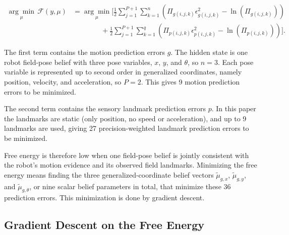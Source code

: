 \begin{align}
    \underset{\mu}{\arg\min}\, \mathcal{F}(y,\mu)
    &=
    \underset{\mu}{\arg\min}
    \Bigg[
    \frac{1}{2}
    \sum_{j=1}^{P+1}
    \sum_{k=1}^{n}
    \left(
        \Pi_{g(i,j,k)}
        \epsilon^2_{g(i,j,k)}
        -
        \ln\left(\Pi_{g(i,j,k)}\right)
    \right)
    \nonumber \\
    &\qquad\qquad+
    \frac{1}{2}
    \sum_{j=1}^{P+1}
    \sum_{k=1}^{q}
    \left(
        \Pi_{p(i,j,k)}
        \epsilon^2_{p(i,j,k)}
        -
        \ln\left(\Pi_{p(i,j,k)}\right)
    \right)
    \Bigg].
    \label{eq:vfe-motion-place-expanded}
\end{align}

The first term contains the motion prediction errors $g$. The hidden state is one robot field-pose belief with three pose variables, $x$, $y$, and $\theta$, so $n=3$. Each pose variable is represented up to second order in generalized coordinates, namely position, velocity, and acceleration, so $P=2$. This gives 9 motion prediction errors to be minimized.

The second term contains the sensory landmark prediction errors $p$. In this paper the landmarks are static (only position, no speed or acceleration), and up to 9 landmarks are used, giving 27 precision-weighted landmark prediction errors to be minimized.


\medskip
Free energy is therefore low when one field-pose belief is jointly consistent with the robot's motion evidence and its observed field landmarks. Minimizing the free energy means finding the three generalized-coordinate belief vectors $\tilde{\mu}_{g,x}$, $\tilde{\mu}_{g,y}$, and $\tilde{\mu}_{g,\theta}$, or nine scalar belief parameters in total, that minimize these 36 prediction errors. This minimization is done by gradient descent.

\subsection{Gradient Descent on the Free Energy}
\label{subsec:gradient-descent-free-energy}

